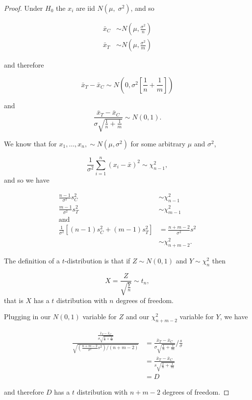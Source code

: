 \documentclass[
  openany]{book}
\theoremstyle{definition}
\theoremstyle{definition}
\theoremstyle{definition}
\theoremstyle{definition}
\theoremstyle{remark}
\begin{document}
\begin{proof}
Under \(H_0\) the \(x_i\) are iid \(N\left(\mu,\;\sigma^2\right)\), and so

\begin{align*}
\bar{x}_C & \sim{N\left(\mu, \frac{\sigma^2}{n}\right)}\\
\bar{x}_T & \sim{N\left(\mu, \frac{\sigma^2}{m}\right)}
\end{align*}

and therefore

\[
\bar{x}_T - \bar{x}_C \sim{N \left(0, \sigma^2\left[\frac{1}{n} + \frac{1}{m}\right] \right)}\]

and
\[
\frac{\bar{x}_T - \bar{x}_C}{\sigma \sqrt{\frac{1}{n}+\frac{1}{m}}} \sim{N\left(0,1\right)}.\]

We know that for \(x_1,\ldots,x_n,\sim N\left(\mu,\sigma^2\right)\) for some arbitrary \(\mu\) and \(\sigma^2\),

\[\frac{1}{\sigma^2}\sum\limits_{i=1}^n\left(x_i - \bar{x}\right)^2 \sim{\chi^2_{n-1}},\]
and so we have

\begin{align*}
\frac{n-1}{\sigma^2}s_C^2 & \sim \chi^2_{n-1}\\
\frac{m-1}{\sigma^2}s_T^2 & \sim \chi^2_{m-1}\\
\text{and} &\\
\frac{1}{\sigma^2}\left[\left(n-1\right)s_C^2 + \left(m-1\right)s_T^2\right] & = \frac{n+m-2}{\sigma^2}s^2\\
&\sim \chi^2_{n+m-2}.
\end{align*}

The definition of a \(t\)-distribution is that if \(Z\sim N\left(0,1\right)\) and \(Y \sim{\chi^2_n}\) then

\[X = \frac{Z} {\sqrt{\frac{Y}{n}}} \sim{t_n},\]
that is \(X\) has a \(t\) distribution with \(n\) degrees of freedom.

Plugging in our \(N\left(0,1\right)\) variable for \(Z\) and our \(\chi^2_{n+m-2}\) variable for \(Y\), we have

\begin{align*}
\frac{\frac{\bar{x}_T - \bar{x}_C}{\sigma\sqrt{\frac{1}{n} + \frac{1}{m}}}}{\sqrt{\left(\frac{n+m-2}{\sigma^2}s^2\right) \bigg/ \left(n+m-2\right)}} & = \frac{\bar{x}_T - \bar{x}_C}{\sigma\sqrt{\frac{1}{n} + \frac{1}{m}}} \bigg/ \frac{s}{\sigma} \\
& = \frac{\bar{x}_T - \bar{x}_C}{s\sqrt{\frac{1}{n} + \frac{1}{m}}} \\
& = D
\end{align*}

and therefore \(D\) has a \(t\) distribution with \(n+m-2\) degrees of freedom.
\end{proof}
\end{document}
